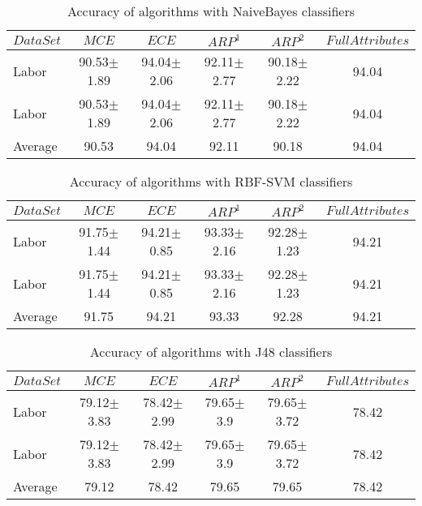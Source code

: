 \documentclass[final,5p,times]{elsarticle}
\begin{document}
\begin{table*}[htbp]
\centering
\caption{Accuracy of  algorithms with NaiveBayes classifiers}
\label{tab:reduction:accresults:naivebayes}
\begin{tabular}{lccccc}
	\toprule
	$DataSet$ &
	$MCE$ &
	$ECE$ &
	$ARP^1$ &
	$ARP^2$ &
	$FullAttributes$ \\
	\midrule
	Labor	&	90.53$\pm$1.89	&	94.04$\pm$2.06	&	92.11$\pm$2.77	&	90.18$\pm$2.22	&	94.04	\\
	Labor	&	90.53$\pm$1.89	&	94.04$\pm$2.06	&	92.11$\pm$2.77	&	90.18$\pm$2.22	&	94.04	\\
	\midrule
	Average	&	90.53	&	94.04	&	92.11	&	90.18	&	94.04	\\
	\bottomrule
	\end{tabular}
\end{table*}



\begin{table*}[htbp]
\centering
\caption{Accuracy of  algorithms with RBF-SVM classifiers}
\label{tab:reduction:accresults:rbf-svm}
\begin{tabular}{lccccc}
	\toprule
	$DataSet$ &
	$MCE$ &
	$ECE$ &
	$ARP^1$ &
	$ARP^2$ &
	$FullAttributes$ \\
	\midrule
	Labor	&	91.75$\pm$1.44	&	94.21$\pm$0.85	&	93.33$\pm$2.16	&	92.28$\pm$1.23	&	94.21	\\
	Labor	&	91.75$\pm$1.44	&	94.21$\pm$0.85	&	93.33$\pm$2.16	&	92.28$\pm$1.23	&	94.21	\\
	\midrule
	Average	&	91.75	&	94.21	&	93.33	&	92.28	&	94.21	\\
	\bottomrule
	\end{tabular}
\end{table*}



\begin{table*}[htbp]
\centering
\caption{Accuracy of  algorithms with J48 classifiers}
\label{tab:reduction:accresults:j48}
\begin{tabular}{lccccc}
	\toprule
	$DataSet$ &
	$MCE$ &
	$ECE$ &
	$ARP^1$ &
	$ARP^2$ &
	$FullAttributes$ \\
	\midrule
	Labor	&	79.12$\pm$3.83	&	78.42$\pm$2.99	&	79.65$\pm$3.9	&	79.65$\pm$3.72	&	78.42	\\
	Labor	&	79.12$\pm$3.83	&	78.42$\pm$2.99	&	79.65$\pm$3.9	&	79.65$\pm$3.72	&	78.42	\\
	\midrule
	Average	&	79.12	&	78.42	&	79.65	&	79.65	&	78.42	\\
	\bottomrule
	\end{tabular}
\end{table*}
\end{document}
